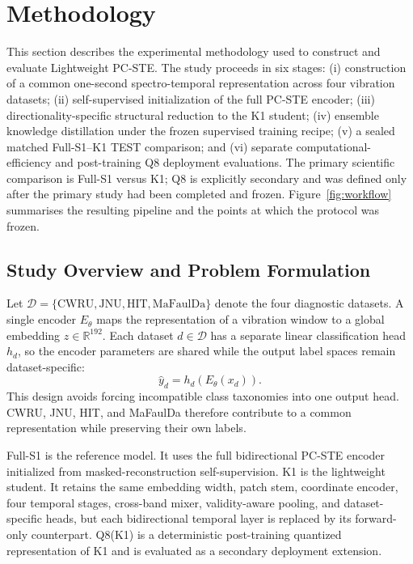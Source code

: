 \section{Methodology}
\label{sec:methodology}

This section describes the experimental methodology used to construct and evaluate Lightweight PC-STE. The study proceeds in six stages: (i) construction of a common one-second spectro-temporal representation across four vibration datasets; (ii) self-supervised initialization of the full PC-STE encoder; (iii) directionality-specific structural reduction to the K1 student; (iv) ensemble knowledge distillation under the frozen supervised training recipe; (v) a sealed matched Full-S1--K1 TEST comparison; and (vi) separate computational-efficiency and post-training Q8 deployment evaluations. The primary scientific comparison is Full-S1 versus K1; Q8 is explicitly secondary and was defined only after the primary study had been completed and frozen. Figure~\ref{fig:workflow} summarises the resulting pipeline and the points at which the protocol was frozen.



\subsection{Study Overview and Problem Formulation}
\label{subsec:overview}

Let $\mathcal{D}=\{\text{CWRU},\text{JNU},\text{HIT},\text{MaFaulDa}\}$ denote the four diagnostic datasets. A single encoder $E_{\theta}$ maps the representation of a vibration window to a global embedding $z\in\mathbb{R}^{192}$. Each dataset $d\in\mathcal{D}$ has a separate linear classification head $h_d$, so the encoder parameters are shared while the output label spaces remain dataset-specific:
\begin{equation}
    \hat{y}_d = h_d\!\left(E_{\theta}(x_d)\right).
\end{equation}
This design avoids forcing incompatible class taxonomies into one output head. CWRU, JNU, HIT, and MaFaulDa therefore contribute to a common representation while preserving their own labels.

Full-S1 is the reference model. It uses the full bidirectional PC-STE encoder initialized from masked-reconstruction self-supervision. K1 is the lightweight student. It retains the same embedding width, patch stem, coordinate encoder, four temporal stages, cross-band mixer, validity-aware pooling, and dataset-specific heads, but each bidirectional temporal layer is replaced by its forward-only counterpart. Q8(K1) is a deterministic post-training quantized representation of K1 and is evaluated as a secondary deployment extension.

